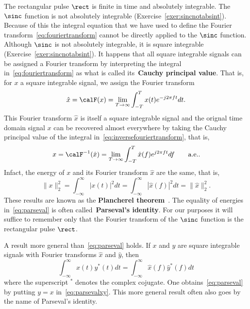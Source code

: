 \documentclass[11pt,a4paper]{book}
\theoremstyle{plain}
\numberwithin{equation}{section}
\newcommand{\term}{\textbf}
\newcommand{\abs}[1]{\left\vert #1 \right\vert}
\begin{document}
The rectangular pulse $\rect$ is finite in time and absolutely integrable.  The $\sinc$ function is not absolutely integrable (Exercise~\ref{exer:sincnotabsint}). Because of this the integral equation that we have used to define the Fourier transform~\eqref{eq:fouriertransform} cannot be directly applied to the $\sinc$ function.  %
Although $\sinc$ is not absolutely integrable, it is square integrable (Exercise~\ref{exer:sincnotabsint}).  It happens that all square integrable signals can be assigned a Fourier transform by interpreting the integral in~\eqref{eq:fouriertransform} as what is called its~\term{Cauchy principal value}.  That is, for $x$ a square integrable signal, we assign the Fourier transform
\[
\hat{x} = \calF(x) = \lim_{T \to \infty}  \int_{-T}^T x(t) e^{-j2\pi ft} dt.
\]
This Fourier transform $\hat{x}$ is itself a square integrable signal and the orignal time domain signal $x$ can be recovered almost everywhere by taking the Cauchy principal value of the integral in~\eqref{eq:inversefouriertransform}, that is,
\[
x = \calF^{-1}(\hat{x}) = \lim_{T \to \infty}  \int_{-T}^T \hat{x}(f) e^{j2\pi f t} df \qquad \text{a.e.}.
\]
Infact, the energy of $x$ and its Fourier transform $\hat{x}$ are the same, that is,
\begin{equation}\label{eq:parseval}
\|x\|_2^2 = \int_{-\infty}^{\infty} \abs{x(t)}^2 dt = \int_{-\infty}^{\infty} \abs{\hat{x}(f)}^2 dt = \|\hat{x}\|_2^2.
\end{equation}
These results are known as the \term{Plancherel theorem}~\cite[Th.~9.13]{Rudin_real_and_complex_analysis}.  The equality of energies in~\eqref{eq:parseval} is often called~\term{Parseval's identity}.  For our purposes it will suffice to remember only that the Fourier transform of the $\sinc$ function is the rectangular pulse $\rect$.
  
A result more general than~\eqref{eq:parseval} holds.  If $x$ and $y$ are square integrable signals with Fourier transforms  $\hat{x}$ and $\hat{y}$, then
\begin{equation} \label{eq:parsevalxy}
\int_{-\infty}^{\infty} x(t)y^*(t) dt = \int_{-\infty}^{\infty} \hat{x}(f)\hat{y}^*(f) dt
\end{equation}
where the superscript $^*$ denotes the complex cojugate.  One obtains~\eqref{eq:parseval} by putting $y = x$ in~\eqref{eq:parsevalxy}. This more general result often also goes by the name of Parseval's identity.
\end{document}
